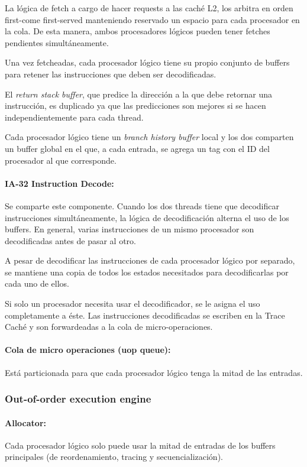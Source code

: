 La lógica de fetch a cargo de hacer requests a las caché L2, los arbitra en orden first-come first-served manteniendo reservado un espacio para cada procesador en la cola. De esta manera, ambos procesadores lógicos pueden tener fetches pendientes simultáneamente. 

Una vez fetcheadas, cada procesador lógico tiene su propio conjunto de buffers para retener las instrucciones que deben ser decodificadas.

El \textit{return stack buffer}, que predice la dirección a la que debe retornar una instrucción, es duplicado ya que las predicciones son mejores si se hacen independientemente para cada thread.

Cada procesador lógico tiene un \textit{branch history buffer} local y los dos comparten un buffer global en el que, a cada entrada, se agrega un tag con el ID del procesador al que corresponde.

\paragraph{IA-32 Instruction Decode: } Se comparte este componente. Cuando los dos threads tiene que decodificar instrucciones simultáneamente, la lógica de decodificación alterna el uso de los buffers. En general, varias instrucciones de un mismo procesador son decodificadas antes de pasar al otro.

A pesar de decodificar las instrucciones de cada procesador lógico por separado, se mantiene una copia de todos los estados necesitados para decodificarlas por cada uno de ellos. 

Si solo un procesador necesita usar el decodificador, se le asigna el uso completamente a éste. Las instrucciones decodificadas se escriben en la Trace Caché y son forwardeadas a la cola de micro-operaciones.

\paragraph{Cola de micro operaciones (uop queue):} Está particionada para que cada procesador lógico tenga la mitad de las entradas.

\subsubsection{Out-of-order execution engine}

\paragraph{Allocator:} Cada procesador lógico solo puede usar la mitad de entradas de los buffers principales (de reordenamiento, tracing y secuencialización).

